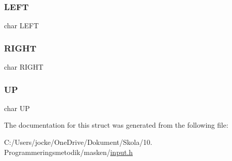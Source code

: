 \mbox{\label{structinputs_abf3a99e39f90b8c0b0adb499e8be44cb}} 
\subsubsection{\texorpdfstring{LEFT}{LEFT}}
{\footnotesize\ttfamily char L\+E\+FT}

\mbox{\label{structinputs_ab56909fbd462ae4fa285e24388efcf9a}} 
\subsubsection{\texorpdfstring{RIGHT}{RIGHT}}
{\footnotesize\ttfamily char R\+I\+G\+HT}

\mbox{\label{structinputs_acf487aade419fe84132d0b08da4636b8}} 
\subsubsection{\texorpdfstring{UP}{UP}}
{\footnotesize\ttfamily char UP}



The documentation for this struct was generated from the following file\+:\begin{DoxyCompactItemize}
\item 
C\+:/\+Users/jocke/\+One\+Drive/\+Dokument/\+Skola/10. Programmeringsmetodik/masken/\mbox{\hyperlink{input_8h}{input.\+h}}\end{DoxyCompactItemize}
